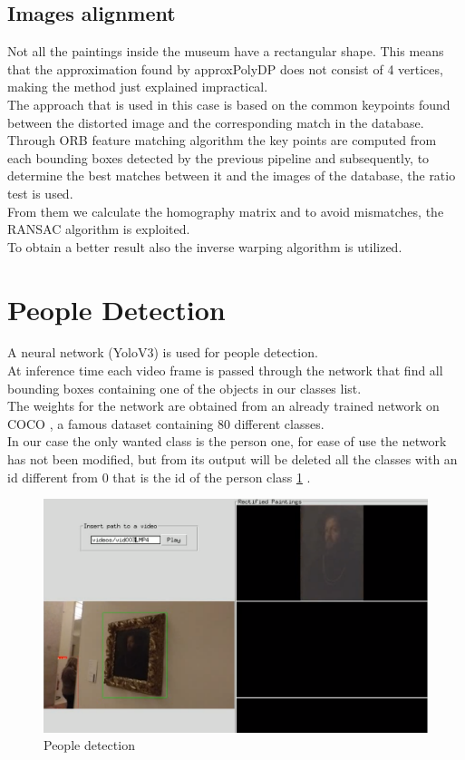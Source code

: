 \documentclass[conference]{IEEEtran}
\begin{document}
\subsection{Images alignment}
Not all the paintings inside the museum have a rectangular shape. This means that the approximation found by approxPolyDP does not consist of 4 vertices, making the method just explained impractical.\\
The approach that is used in this case is based on the common keypoints found between the distorted image and the corresponding match in the database.\\
Through ORB feature matching algorithm the key points are computed from each bounding boxes detected by the previous pipeline and subsequently, to determine the best matches between it and the images of the database, the ratio test is used.\\
From them we calculate the homography matrix and
to avoid mismatches, the RANSAC algorithm is exploited.\\
To obtain a better result also the inverse warping algorithm is utilized.\\

\section{People Detection}
A neural network (YoloV3) is used for people detection.\\
At inference time each video frame is passed through the network that find all bounding boxes containing one of the objects in our classes list.\\
The weights for the network are obtained from an already trained network on COCO \cite{b11}, a famous dataset containing 80 different classes.\\
In our case the only wanted class is the person one, for ease of use the network has not been modified, but from its output will be deleted all the classes with an id different from 0 that is the id of the person class \ref{fig_People_detection} .\\

\begin{figure}[htbp]
\centerline{\includegraphics[width=0.8\columnwidth]{../people_detection/paint_and_person.png}}
\caption{People detection}
\label{fig_People_detection}
\end{figure}
\end{document}
